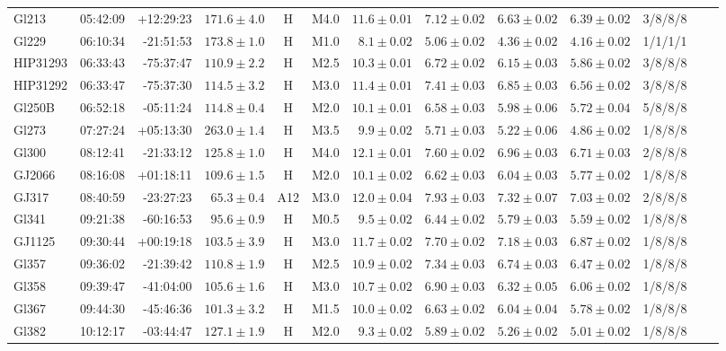 \documentclass{aa}
\begin{document}
\begin{table}[h!]
{\begin{tabular}{ l r r r c c r r r r r r r}
Gl213 & 05:42:09 & +12:29:23 & $171.6 \pm  4.0$ & H & M4.0 & $11.6 \pm 0.01$ & $7.12 \pm 0.02$ & $6.63 \pm 0.02$ & $6.39 \pm 0.02$ & 3/8/8/8 \\
Gl229 & 06:10:34 & -21:51:53 & $173.8 \pm  1.0$ & H & M1.0 & $ 8.1 \pm 0.02$ & $5.06 \pm 0.02$ & $4.36 \pm 0.02$ & $4.16 \pm 0.02$ & 1/1/1/1 \\
HIP31293 & 06:33:43 & -75:37:47 & $110.9 \pm  2.2$ & H & M2.5 & $10.3 \pm 0.01$ & $6.72 \pm 0.02$ & $6.15 \pm 0.03$ & $5.86 \pm 0.02$ & 3/8/8/8 \\
HIP31292 & 06:33:47 & -75:37:30 & $114.5 \pm  3.2$ & H & M3.0 & $11.4 \pm 0.01$ & $7.41 \pm 0.03$ & $6.85 \pm 0.03$ & $6.56 \pm 0.02$ & 3/8/8/8 \\
Gl250B & 06:52:18 & -05:11:24 & $114.8 \pm  0.4$ & H & M2.0 & $10.1 \pm 0.01$ & $6.58 \pm 0.03$ & $5.98 \pm 0.06$ & $5.72 \pm 0.04$ & 5/8/8/8 \\
Gl273 & 07:27:24 & +05:13:30 & $263.0 \pm  1.4$ & H & M3.5 & $ 9.9 \pm 0.02$ & $5.71 \pm 0.03$ & $5.22 \pm 0.06$ & $4.86 \pm 0.02$ & 1/8/8/8 \\
Gl300 & 08:12:41 & -21:33:12 & $125.8 \pm  1.0$ & H & M4.0 & $12.1 \pm 0.01$ & $7.60 \pm 0.02$ & $6.96 \pm 0.03$ & $6.71 \pm 0.03$ & 2/8/8/8 \\
GJ2066 & 08:16:08 & +01:18:11 & $109.6 \pm  1.5$ & H & M2.0 & $10.1 \pm 0.02$ & $6.62 \pm 0.03$ & $6.04 \pm 0.03$ & $5.77 \pm 0.02$ & 1/8/8/8 \\
GJ317 & 08:40:59 & -23:27:23 & $65.3 \pm  0.4$ & A12 & M3.0 & $12.0 \pm 0.04$ & $7.93 \pm 0.03$ & $7.32 \pm 0.07$ & $7.03 \pm 0.02$ & 2/8/8/8 \\
Gl341 & 09:21:38 & -60:16:53 & $95.6 \pm  0.9$ & H & M0.5 & $ 9.5 \pm 0.02$ & $6.44 \pm 0.02$ & $5.79 \pm 0.03$ & $5.59 \pm 0.02$ & 1/8/8/8 \\
GJ1125 & 09:30:44 & +00:19:18 & $103.5 \pm  3.9$ & H & M3.0 & $11.7 \pm 0.02$ & $7.70 \pm 0.02$ & $7.18 \pm 0.03$ & $6.87 \pm 0.02$ & 1/8/8/8 \\
Gl357 & 09:36:02 & -21:39:42 & $110.8 \pm  1.9$ & H & M2.5 & $10.9 \pm 0.02$ & $7.34 \pm 0.03$ & $6.74 \pm 0.03$ & $6.47 \pm 0.02$ & 1/8/8/8 \\
Gl358 & 09:39:47 & -41:04:00 & $105.6 \pm  1.6$ & H & M3.0 & $10.7 \pm 0.02$ & $6.90 \pm 0.03$ & $6.32 \pm 0.05$ & $6.06 \pm 0.02$ & 1/8/8/8 \\
Gl367 & 09:44:30 & -45:46:36 & $101.3 \pm  3.2$ & H & M1.5 & $10.0 \pm 0.02$ & $6.63 \pm 0.02$ & $6.04 \pm 0.04$ & $5.78 \pm 0.02$ & 1/8/8/8 \\
Gl382 & 10:12:17 & -03:44:47 & $127.1 \pm  1.9$ & H & M2.0 & $ 9.3 \pm 0.02$ & $5.89 \pm 0.02$ & $5.26 \pm 0.02$ & $5.01 \pm 0.02$ & 1/8/8/8 \\

\end{tabular}}
\end{table}
\end{document}
